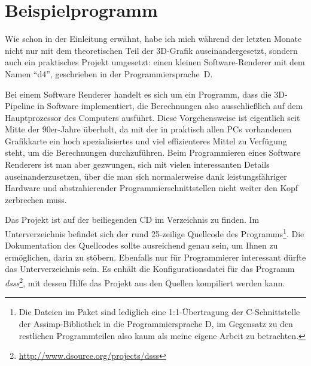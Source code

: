 \chapter{Beispielprogramm}
\label{beispielprogramm}

Wie schon in der Einleitung erwähnt, habe ich mich während der letzten Monate nicht nur mit dem theoretischen Teil der 3D-Grafik auseinandergesetzt, sondern auch ein praktisches Projekt umgesetzt: einen kleinen Software-Renderer mit dem Namen \enquote{d4}, geschrieben in der Programmiersprache~D.

Bei einem Software Renderer handelt es sich um ein Programm, dass die 3D-Pipeline in Software implementiert, die Berechnungen also ausschließlich auf dem Hauptprozessor des Computers ausführt. Diese Vorgehensweise ist eigentlich seit Mitte der 90er-Jahre überholt, da mit der in praktisch allen PCs vorhandenen Grafikkarte ein hoch spezialisiertes und viel effizienteres Mittel zu Verfügung steht, um die Berechnungen durchzuführen. Beim Programmieren eines Software Renderers ist man aber gezwungen, sich mit vielen interessanten Details auseinanderzusetzen, über die man sich normalerweise dank leistungsfähriger Hardware und abstrahierender Programmierschnittstellen nicht weiter den Kopf zerbrechen muss.

Das Projekt ist auf der beiliegenden CD im Verzeichnis  zu finden. Im Unterverzeichnis  befindet sich der rund 25-zeilige Quellcode des Programms\footnote{Die Dateien im Paket  sind lediglich eine 1:1-Übertragung der C-Schnittstelle der Assimp-Bibliothek in die Programmiersprache D, im Gegensatz zu den restlichen Programmteilen also kaum als meine eigene Arbeit zu betrachten.}. Die Dokumentation des Quellcodes sollte ausreichend genau sein, um Ihnen zu ermöglichen, darin zu stöbern. Ebenfalls nur für Programmierer interessant dürfte das Unterverzeichnis  sein. Es enhält die Konfigurationsdatei für das Programm \emph{dsss}\footnote{\url{http://www.dsource.org/projects/dsss}}, mit dessen Hilfe das Projekt aus den Quellen kompiliert werden kann.

